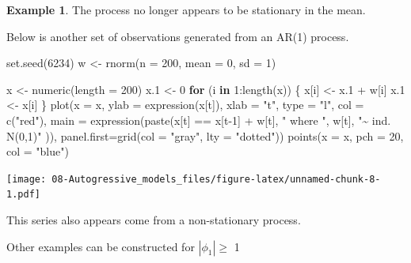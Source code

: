 \documentclass[
]{book}
\newenvironment{Shaded}{\begin{snugshade}}{\end{snugshade}}
\newcommand{\AttributeTok}[1]{\textcolor[rgb]{0.77,0.63,0.00}{#1}}
\newcommand{\ControlFlowTok}[1]{\textcolor[rgb]{0.13,0.29,0.53}{\textbf{#1}}}
\newcommand{\DecValTok}[1]{\textcolor[rgb]{0.00,0.00,0.81}{#1}}
\newcommand{\FloatTok}[1]{\textcolor[rgb]{0.00,0.00,0.81}{#1}}
\newcommand{\FunctionTok}[1]{\textcolor[rgb]{0.00,0.00,0.00}{#1}}
\newcommand{\NormalTok}[1]{#1}
\newcommand{\OtherTok}[1]{\textcolor[rgb]{0.56,0.35,0.01}{#1}}
\newcommand{\SpecialCharTok}[1]{\textcolor[rgb]{0.00,0.00,0.00}{#1}}
\newcommand{\StringTok}[1]{\textcolor[rgb]{0.31,0.60,0.02}{#1}}
\theoremstyle{definition}
\theoremstyle{definition}
\newtheorem{example}{Example}[chapter]
\theoremstyle{definition}
\theoremstyle{definition}
\theoremstyle{remark}
\begin{document}
\begin{example}
The process no longer appears to be stationary in the mean.

Below is another set of observations generated from an AR(1) process.

\begin{Shaded}
\begin{Highlighting}[]
\FunctionTok{set.seed}\NormalTok{(}\DecValTok{6234}\NormalTok{)  }
\NormalTok{w }\OtherTok{\textless{}{-}} \FunctionTok{rnorm}\NormalTok{(}\AttributeTok{n =} \DecValTok{200}\NormalTok{, }\AttributeTok{mean =} \DecValTok{0}\NormalTok{, }\AttributeTok{sd =} \DecValTok{1}\NormalTok{)}

\NormalTok{x }\OtherTok{\textless{}{-}} \FunctionTok{numeric}\NormalTok{(}\AttributeTok{length =} \DecValTok{200}\NormalTok{)}
\NormalTok{x}\FloatTok{.1} \OtherTok{\textless{}{-}} \DecValTok{0}
\ControlFlowTok{for}\NormalTok{ (i }\ControlFlowTok{in} \DecValTok{1}\SpecialCharTok{:}\FunctionTok{length}\NormalTok{(x)) \{}
\NormalTok{  x[i] }\OtherTok{\textless{}{-}}\NormalTok{ x}\FloatTok{.1}  \SpecialCharTok{+}\NormalTok{ w[i] }
\NormalTok{  x}\FloatTok{.1} \OtherTok{\textless{}{-}}\NormalTok{ x[i] }
\NormalTok{\}}
\FunctionTok{plot}\NormalTok{(}\AttributeTok{x =}\NormalTok{ x, }\AttributeTok{ylab =} \FunctionTok{expression}\NormalTok{(x[t]), }\AttributeTok{xlab =} \StringTok{"t"}\NormalTok{, }\AttributeTok{type =} 
  \StringTok{"l"}\NormalTok{, }\AttributeTok{col =} \FunctionTok{c}\NormalTok{(}\StringTok{"red"}\NormalTok{), }\AttributeTok{main =} 
  \FunctionTok{expression}\NormalTok{(}\FunctionTok{paste}\NormalTok{(x[t] }\SpecialCharTok{==}\NormalTok{ x[t}\DecValTok{{-}1}\NormalTok{] }\SpecialCharTok{+}\NormalTok{ w[t], }\StringTok{" where "}\NormalTok{, }
\NormalTok{  w[t], }\StringTok{"\textasciitilde{} ind. N(0,1)"}\NormalTok{ )), }\AttributeTok{panel.first=}\FunctionTok{grid}\NormalTok{(}\AttributeTok{col =} 
  \StringTok{"gray"}\NormalTok{, }\AttributeTok{lty =} \StringTok{"dotted"}\NormalTok{))}
\FunctionTok{points}\NormalTok{(}\AttributeTok{x =}\NormalTok{ x, }\AttributeTok{pch =} \DecValTok{20}\NormalTok{, }\AttributeTok{col =} \StringTok{"blue"}\NormalTok{)}
\end{Highlighting}
\end{Shaded}

\texttt{[image: 08-Autogressive\_models\_files/figure-latex/unnamed-chunk-8-1.pdf]}

This series also appears come from a non-stationary process.

Other examples can be constructed for \(|\phi_1|\ge\) 1
\end{example}
\end{document}
